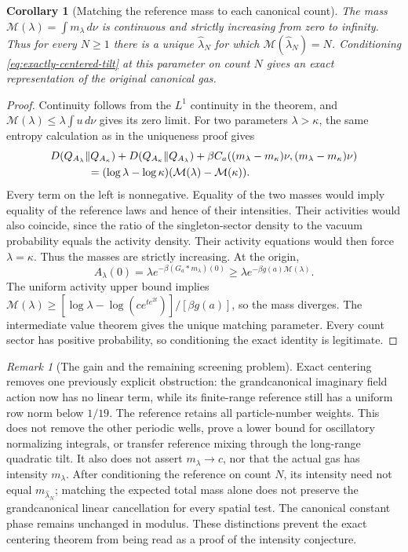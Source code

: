 \documentclass[11pt]{article}
\newtheorem{corollary}[theorem]{Corollary}
\theoremstyle{remark}\newtheorem{remark}[theorem]{Remark}
\begin{document}
\begin{corollary}[Matching the reference mass to each canonical count]
\label{cor:exact-centering-mass}
The mass $\mathcal M(\lambda)=\int m_\lambda\,d\nu$ is continuous
and strictly increasing from zero to infinity.  Thus for every
$N\ge1$ there is a unique $\widehat\lambda_N$ for which
$\mathcal M(\widehat\lambda_N)=N$.  Conditioning
\eqref{eq:exactly-centered-tilt} at this parameter on count $N$
gives an exact representation of the original canonical gas.
\end{corollary}
\begin{proof}
Continuity follows from the $L^1$ continuity in the theorem, and
$\mathcal M(\lambda)\le\lambda\int u\,d\nu$ gives its zero limit.
For two parameters $\lambda>\kappa$, the same entropy calculation as
in the uniqueness proof gives
\begin{align*}
 &D(Q_{A_\lambda}\Vert Q_{A_\kappa})
  +D(Q_{A_\kappa}\Vert Q_{A_\lambda})
  +\beta C_a((m_\lambda-m_\kappa)\nu,
                    (m_\lambda-m_\kappa)\nu)\\
 &\hspace{12mm}=(\log\lambda-\log\kappa)
                    (\mathcal M(\lambda)-\mathcal M(\kappa)).
\end{align*}
Every term on the left is nonnegative.  Equality of the two masses
would imply equality of the reference laws and hence of their
intensities.  Their activities would also coincide, since the ratio
of the singleton-sector density to the vacuum probability equals the
activity density.  Their activity equations would then force
$\lambda=\kappa$.  Thus the masses are strictly increasing.
At the origin,
\[
 A_\lambda(0)=\lambda e^{-\beta(G_a*m_\lambda)(0)}
 \ge\lambda e^{-\beta g(a)\mathcal M(\lambda)}.
\]
The uniform activity upper bound implies
$\mathcal M(\lambda)\ge
 [\log\lambda-\log(c e^{t e^{2t}})]/[\beta g(a)]$,
so the mass diverges.  The intermediate value theorem gives the
unique matching parameter.  Every count sector has positive
probability, so conditioning the exact identity is legitimate.
\end{proof}

\begin{remark}[The gain and the remaining screening problem]
Exact centering removes one previously explicit obstruction: the
grandcanonical imaginary field action now has no linear term, while
its finite-range reference still has a uniform row norm below $1/19$.
The reference retains all particle-number weights.  This does not
remove the other periodic wells, prove a lower bound for oscillatory
normalizing integrals, or transfer reference mixing through the
long-range quadratic tilt.  It also does not assert
$m_\lambda\to c$, nor that the actual gas has intensity $m_\lambda$.
After conditioning the reference on count $N$, its intensity need not
equal $m_{\widehat\lambda_N}$; matching the expected total mass alone
does not preserve the grandcanonical linear cancellation for every
spatial test.  The canonical constant phase remains unchanged in
modulus.  These distinctions prevent the exact centering theorem
from being read as a proof of the intensity conjecture.
\end{remark}
\end{document}
